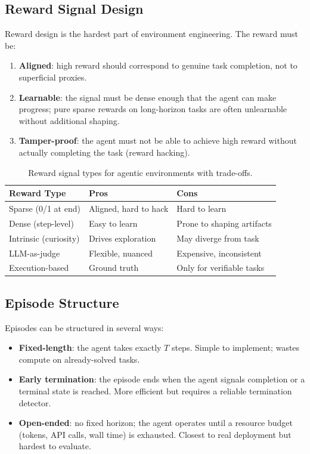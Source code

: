 \subsection{Reward Signal Design}
\label{reward-signal-design}

Reward design is the hardest part of environment engineering. The reward must be:

\begin{enumerate}
  \item \textbf{Aligned}: high reward should correspond to genuine task completion, not to superficial proxies.
  \item \textbf{Learnable}: the signal must be dense enough that the agent can make progress; pure sparse rewards on long-horizon tasks are often unlearnable without additional shaping.
  \item \textbf{Tamper-proof}: the agent must not be able to achieve high reward without actually completing the task (reward hacking).
\end{enumerate}

\begin{table}[ht!]
\centering
\caption{Reward signal types for agentic environments with trade-offs.}
\begin{tabular}{@{}lp{5cm}p{8cm}@{}}
\toprule
\textbf{Reward Type} & \textbf{Pros} & \textbf{Cons} \\
\midrule
Sparse (0/1 at end) & Aligned, hard to hack & Hard to learn \\
Dense (step-level) & Easy to learn & Prone to shaping artifacts \\
Intrinsic (curiosity) & Drives exploration & May diverge from task \\
LLM-as-judge & Flexible, nuanced & Expensive, inconsistent \\
Execution-based & Ground truth & Only for verifiable tasks \\
\bottomrule
\end{tabular}
\end{table}

\subsection{Episode Structure}
\label{episode-structure}

Episodes can be structured in several ways:

\begin{itemize}
  \item \textbf{Fixed-length}: the agent takes exactly $T$ steps. Simple to implement; wastes compute on already-solved tasks.
  \item \textbf{Early termination}: the episode ends when the agent signals completion or a terminal state is reached. More efficient but requires a reliable termination detector.
  \item \textbf{Open-ended}: no fixed horizon; the agent operates until a resource budget (tokens, API calls, wall time) is exhausted. Closest to real deployment but hardest to evaluate.
\end{itemize}


